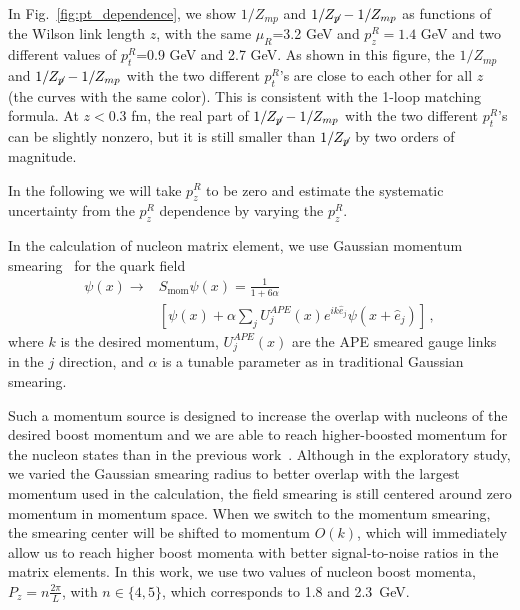 In Fig.~\ref{fig:pt_dependence},  we show $1/Z_{mp}$ and $1/Z_{\slashed{p}}-1/Z_{mp}$ as functions of the Wilson link length $z$, with the same $\mu_R$=3.2 GeV and $p_z^R=1.4$ GeV and two different values of $p_t^R$=0.9 GeV and 2.7 GeV.  As shown in this figure, the  $1/Z_{mp}$ and $1/Z_{\slashed{p}}-1/Z_{mp}$ with the two different $p_t^R$'s are close  to each other for all $z$ (the curves with the same color).    This  is consistent with the 1-loop matching formula.   At $z<0.3$ fm, the real part of $1/Z_{\slashed{p}}-1/Z_{mp}$  with the two different $p_t^R$'s can be slightly nonzero, but it is  still  smaller than $1/Z_{\slashed{p}}$ by  two orders of magnitude.


In the following  we will take $p_z^R$ to be zero and estimate the systematic uncertainty from the $p_z^R$ dependence by varying the $p_z^R$.


In the calculation of nucleon matrix element, we use Gaussian momentum smearing~\cite{Bali:2016lva} for the quark field
\begin{align}\label{eq:moms}
\psi(x)\to &S_\text{mom}\psi(x) = \frac{1}{1+6\alpha}\nonumber\\
&\left[\psi(x) + \alpha \sum_j U^{APE}_j(x)e^{ik\hat{e}_j}\psi(x+\hat{e}_j)\right]\, ,
\end{align}
where $k$ is the desired momentum,  {$U^{APE}_j(x)$ are the APE smeared} gauge links in the $j$ direction, and $\alpha$ is a tunable parameter as in traditional Gaussian smearing.

Such a momentum source is designed to increase the overlap with nucleons of the desired boost momentum and we are able to reach
higher-boosted momentum for the nucleon states than
in the  previous work~\cite{Chen:2017mzz}. Although in the  exploratory
study, we varied the  Gaussian smearing radius to better
overlap with the largest momentum used in the calculation, the field smearing  is still centered around
zero momentum in momentum space. When we switch
to the momentum smearing, the  smearing center will be shifted to momentum $O(k)$, which will immediately allow us to reach higher boost momenta with better signal-to-noise ratios in the matrix elements. 
In this work, we use  two  values of nucleon boost momenta, $P_z=n \frac{2\pi}{L}$, with $n \in \{4,5\}$, which corresponds to 1.8 and 2.3~GeV.



